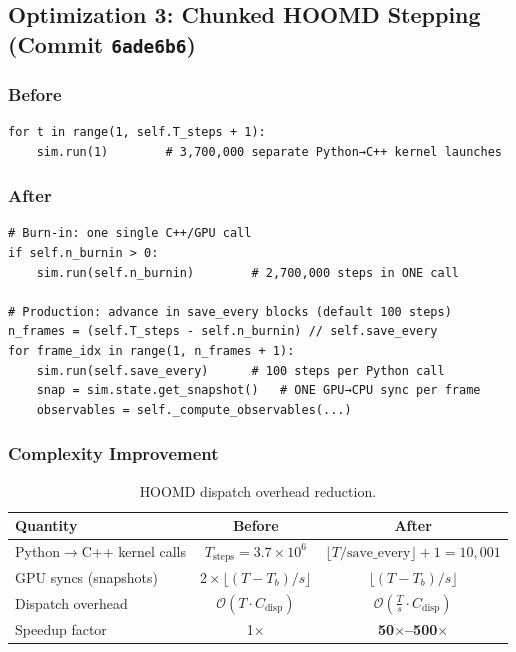\documentclass[12pt,a4paper]{article}
\newcommand{\Obig}[1]{\mathcal{O}\!\left(#1\right)}
\begin{document}
\subsection{Optimization 3: Chunked HOOMD Stepping (Commit \texttt{6ade6b6})}
\label{sec:hoomd}

\subsubsection{Before}
\begin{lstlisting}[caption={Original per-step HOOMD dispatch.}]
for t in range(1, self.T_steps + 1):
    sim.run(1)        # 3,700,000 separate Python→C++ kernel launches
\end{lstlisting}

\subsubsection{After}
\begin{lstlisting}[caption={Optimised chunked HOOMD dispatch.}]
# Burn-in: one single C++/GPU call
if self.n_burnin > 0:
    sim.run(self.n_burnin)        # 2,700,000 steps in ONE call

# Production: advance in save_every blocks (default 100 steps)
n_frames = (self.T_steps - self.n_burnin) // self.save_every
for frame_idx in range(1, n_frames + 1):
    sim.run(self.save_every)      # 100 steps per Python call
    snap = sim.state.get_snapshot()   # ONE GPU→CPU sync per frame
    observables = self._compute_observables(...)
\end{lstlisting}

\subsubsection{Complexity Improvement}

\begin{table}[h]
\centering
\caption{HOOMD dispatch overhead reduction.}
\label{tab:hoomd}
\begin{tabular}{lcc}
\toprule
Quantity & Before & After \\
\midrule
Python$\to$C++ kernel calls & $T_\text{steps} = 3.7\times10^6$ & $\lfloor T/\text{save\_every}\rfloor + 1 = 10{,}001$ \\
GPU syncs (snapshots)       & $2 \times \lfloor(T-T_b)/s\rfloor$ & $\lfloor(T-T_b)/s\rfloor$ \\
Dispatch overhead            & $\Obig{T \cdot C_\text{disp}}$ & $\Obig{\frac{T}{s} \cdot C_\text{disp}}$ \\
Speedup factor               & 1$\times$ & \textbf{50$\times$--500$\times$} \\
\bottomrule
\end{tabular}
\end{table}
\end{document}
